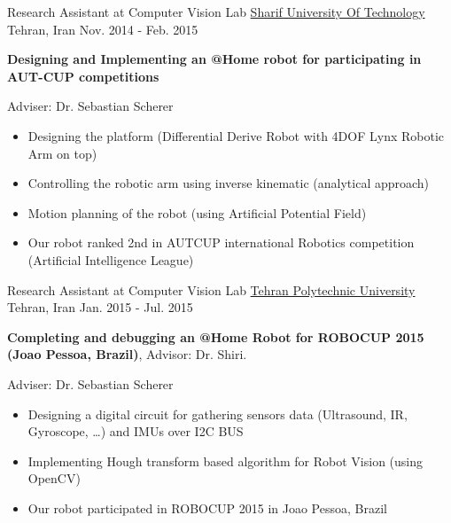 \begin{cventries}
  \cventry
    {Research Assistant at Computer Vision Lab} %
    {\href{http://www.sharif.ir/web/en}{Sharif University Of Technology}} %
    {Tehran, Iran} %
    {Nov. 2014 - Feb. 2015} %
    {
      \begin{cvitems} %
			\item \textbf{Designing and Implementing an @Home robot for participating in AUT-CUP competitions} \begin{flushright} {\color{awesome} Adviser: Dr. Sebastian Scherer} \end{flushright}
			\begin{itemize}
					\item Designing the platform (Differential Derive Robot with 4DOF Lynx Robotic Arm on top)
					\item Controlling the robotic arm using inverse kinematic (analytical approach)
					\item Motion planning of the robot (using Artificial Potential Field)
					\item Our robot ranked 2nd in AUTCUP international Robotics competition (Artificial Intelligence League)
			\end{itemize}
      \end{cvitems}
    }

  \cventry
    {Research Assistant at Computer Vision Lab} %
    {\href{http://aut.ac.ir/aut/}{Tehran Polytechnic University}} %
    {Tehran, Iran} %
    {Jan. 2015 - Jul. 2015} %
    {
      \begin{cvitems} %
        \item \textbf{Completing and debugging an @Home Robot for ROBOCUP 2015 (Joao Pessoa, Brazil)}, Advisor: Dr. Shiri.\begin{flushright} {\color{awesome} Adviser: Dr. Sebastian Scherer} \end{flushright}
        \begin{itemize}
        \item Designing a digital circuit for gathering sensors data (Ultrasound, IR, Gyroscope, …) and IMUs over I2C BUS 
        \item Implementing Hough transform based algorithm for Robot Vision (using OpenCV)
        \item Our robot participated in ROBOCUP 2015 in Joao Pessoa, Brazil
        \end{itemize}
      \end{cvitems}
    }


\end{cventries}
